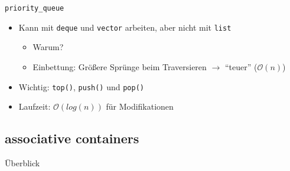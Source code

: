 \begin{frame}{\texttt{priority\_queue}}
	\begin{itemize}
		\item Kann mit \texttt{deque} und \texttt{vector} arbeiten, aber nicht mit \texttt{list}
		\begin{itemize}
			\item \alert{Warum?}
			\pause
			\item Einbettung: Größere Sprünge beim Traversieren $\rightarrow$ \enquote{teuer} ($\mathcal{O}(n)$)
		\end{itemize}
		\item Wichtig: \texttt{top()}, \texttt{push()} und \texttt{pop()}
		\pause
		\item Laufzeit: $\mathcal{O}(log(n))$ für Modifikationen
	\end{itemize}
	
	\pause
	
	
\end{frame}

\subsection{associative containers}

\begin{frame}{Überblick}

\end{frame}

